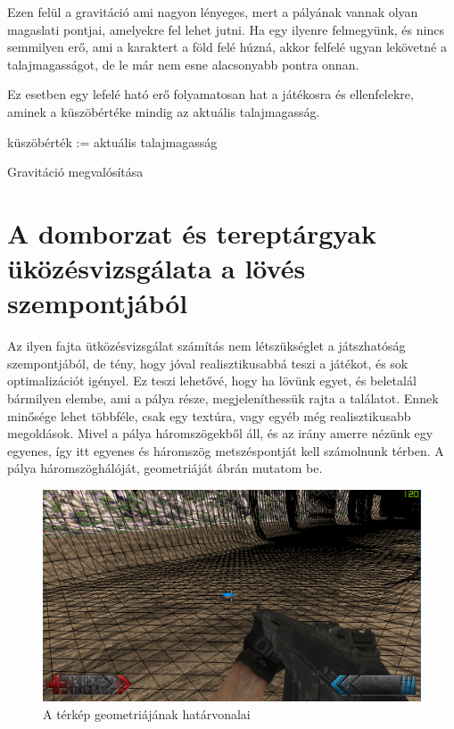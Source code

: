 Ezen felül a gravitáció ami nagyon lényeges, mert a pályának vannak olyan magaslati pontjai, amelyekre fel lehet jutni. Ha egy ilyenre felmegyünk, és nincs semmilyen erő, ami a karaktert a föld felé húzná, akkor felfelé ugyan lekövetné a talajmagasságot, de le már nem esne alacsonyabb pontra onnan.

 Ez esetben egy lefelé ható erő folyamatosan hat a játékosra és ellenfelekre, aminek a küszöbértéke mindig az aktuális talajmagasság.

\begin{algorithm}[H]
 küszöbérték := aktuális talajmagasság\;
 \caption{Gravitáció megvalósítása}
\end{algorithm} 
 
\section{A domborzat és tereptárgyak üközésvizsgálata a lövés szempontjából}

Az ilyen fajta ütközésvizsgálat számítás nem létszükséglet a játszhatóság szempontjából, de tény, hogy jóval realisztikusabbá teszi a játékot, és sok optimalizációt igényel. Ez teszi lehetővé, hogy ha lövünk egyet, és beletalál bármilyen elembe, ami a pálya része, megjeleníthessük rajta a találatot. Ennek minősége lehet többféle, csak egy textúra, vagy egyéb még realisztikusabb megoldások. Mivel a pálya háromszögekből áll, és az irány amerre nézünk egy egyenes, így itt egyenes és háromszög metszéspontját kell számolnunk térben. A pálya háromszöghálóját, geometriáját  ábrán mutatom be.

\begin{figure}[h]
\centering
\includegraphics[scale=0.4]{kepek/map_wireframe.png}
\caption{A térkép geometriájának határvonalai}
\label{fig:wireframe}
\end{figure}


